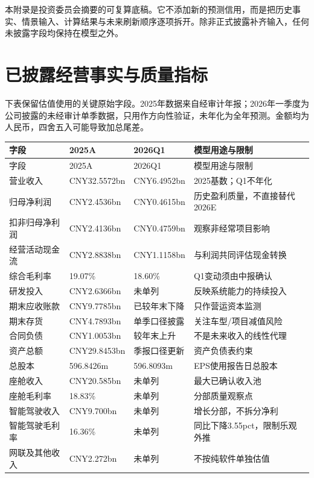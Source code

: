 \renewcommand{\arraystretch}{1.65}

本附录是投资委员会摘要的可复算底稿。它不添加新的预测信用，而是把历史事实、情景输入、计算结果与未来刷新顺序逐项拆开。除非正式披露补齐输入，任何未披露字段均保持在模型之外。

\section{已披露经营事实与质量指标}

下表保留估值使用的关键原始字段。2025年数据来自经审计年报；2026年一季度为公司披露的未经审计单季数据，只用作方向性验证，未年化为全年预测。金额均为人民币，四舍五入可能导致加总尾差。

\begin{longtable}{L{3.3cm}L{2.4cm}L{2.4cm}L{3.7cm}}
\toprule
字段 & 2025A & 2026Q1 & 模型用途与限制 \\
\midrule
\endfirsthead
\toprule
字段 & 2025A & 2026Q1 & 模型用途与限制 \\
\midrule
\endhead
营业收入 & CNY32.5572bn & CNY6.4952bn & 2025基数；Q1不年化 \\
归母净利润 & CNY2.4536bn & CNY0.4615bn & 历史盈利质量，不直接替代2026E \\
扣非归母净利润 & CNY2.4136bn & CNY0.4759bn & 观察非经常项目影响 \\
经营活动现金流 & CNY2.8838bn & CNY1.1158bn & 与利润共同评估现金转换 \\
综合毛利率 & 19.07\% & 18.60\% & Q1变动须由中报确认 \\
研发投入 & CNY2.6366bn & 未单列 & 反映系统能力的持续投入 \\
期末应收账款 & CNY9.7785bn & 已较年末下降 & 只作营运资本监测 \\
期末存货 & CNY4.7893bn & 单季口径披露 & 关注车型/项目减值风险 \\
合同负债 & CNY1.0053bn & 较年末上升 & 不是未来收入的线性代理 \\
资产总额 & CNY29.8453bn & 季报口径更新 & 资产负债表约束 \\
总股本 & 596.8426m & 596.8093m & EPS使用报告日总股本 \\
座舱收入 & CNY20.585bn & 未单列 & 最大已确认收入池 \\
座舱毛利率 & 18.83\% & 未单列 & 分部质量观察点 \\
智能驾驶收入 & CNY9.700bn & 未单列 & 增长分部，不拆分净利 \\
智能驾驶毛利率 & 16.36\% & 未单列 & 同比下降3.55pct，限制乐观外推 \\
网联及其他收入 & CNY2.272bn & 未单列 & 不按纯软件单独估值 \\
\bottomrule
\end{longtable}

